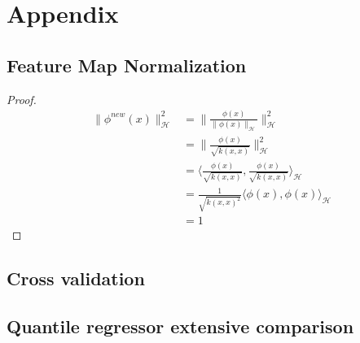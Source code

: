 \chapter{Appendix}
\section{Feature Map Normalization}\label{appendix:new_feature}
\begin{proof}
\begin{align*}
    \|
    \phi^{new}(x)\|_{\mathcal{H}}^{2} &= \|\frac{\phi(x)}{\|\phi(x)\|_{\mathcal{H}}}
    \|_{\mathcal{H}}^{2}
    \\
    &=
    \|
    \frac{\phi(x)}
    {\sqrt{k(x,x)}}
    \|_{\mathcal{H}}^{2}
    \\
    &=
    \langle
    \frac{\phi(x)}
    {\sqrt{k(x,x)}}
    ,
    \frac{\phi(x)}
    {\sqrt{k(x,x)}}
    \rangle_{\mathcal{H}}
    \\
    &=
    \frac{1}{\sqrt{k(x,x)^{2}}}
    \langle
    \phi(x)
    ,
    \phi(x)
    \rangle_{\mathcal{H}}
    \\
    &=1
\end{align*}
\end{proof}

\section{Cross validation}\label{appendix:cross_validation}



\section{Quantile regressor extensive comparison}\label{appendix:quantile_regressor_extensive_comparison}
